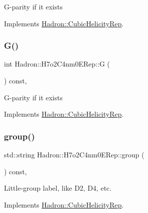 G-\/parity if it exists 

Implements \mbox{\hyperlink{structHadron_1_1CubicHelicityRep_a50689f42be1e6170aa8cf6ad0597018b}{Hadron\+::\+Cubic\+Helicity\+Rep}}.

\mbox{\label{structHadron_1_1H7o2C4nm0ERep_a41ed014e3b78c3dfc40b8e8afee43477}} 
\subsubsection{\texorpdfstring{G()}{G()}\hspace{0.1cm}{\footnotesize\ttfamily [2/2]}}
{\footnotesize\ttfamily int Hadron\+::\+H7o2\+C4nm0\+E\+Rep\+::G (\begin{DoxyParamCaption}{ }\end{DoxyParamCaption}) const\hspace{0.3cm}{\ttfamily [inline]}, {\ttfamily [virtual]}}

G-\/parity if it exists 

Implements \mbox{\hyperlink{structHadron_1_1CubicHelicityRep_a50689f42be1e6170aa8cf6ad0597018b}{Hadron\+::\+Cubic\+Helicity\+Rep}}.

\mbox{\label{structHadron_1_1H7o2C4nm0ERep_ae7293b4f57a530ceb630b43a1036f5c4}} 
\subsubsection{\texorpdfstring{group()}{group()}\hspace{0.1cm}{\footnotesize\ttfamily [1/2]}}
{\footnotesize\ttfamily std\+::string Hadron\+::\+H7o2\+C4nm0\+E\+Rep\+::group (\begin{DoxyParamCaption}{ }\end{DoxyParamCaption}) const\hspace{0.3cm}{\ttfamily [inline]}, {\ttfamily [virtual]}}

Little-\/group label, like D2, D4, etc. 

Implements \mbox{\hyperlink{structHadron_1_1CubicHelicityRep_a101a7d76cd8ccdad0f272db44b766113}{Hadron\+::\+Cubic\+Helicity\+Rep}}.

\mbox{\label{structHadron_1_1H7o2C4nm0ERep_ae7293b4f57a530ceb630b43a1036f5c4}} 
